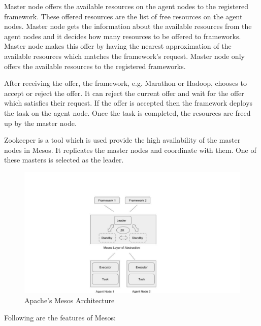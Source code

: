 Master node offers the available resources on the agent nodes to the registered framework. These offered resources are the list of free resources on the agent nodes. Master node gets the information about the available resources from the agent nodes and it decides how many resources to be offered to frameworks. Master node makes this offer by having the nearest approximation of the available resources which matches the framework's request. Master node only offers the available resources to the registered frameworks.
 
After receiving the offer, the framework, e.g. Marathon or Hadoop, chooses to accept or reject the offer. It can reject the current offer and wait for the offer which satisfies their request. If the offer is accepted then the framework deploys the task on the agent node. Once the task is completed, the resources are freed up by the master node. 

Zookeeper is a tool which is used provide the high availability of the master nodes in Mesos. It replicates the master nodes and coordinate with them. One of these masters is selected as the leader.

\begin{figure}
\centering
\includegraphics[scale=0.5]{./fig/mesos}
\caption{Apache's Mesos Architecture}
\label{fig:mesosArch}
\end{figure}

Following are the features of Mesos:

